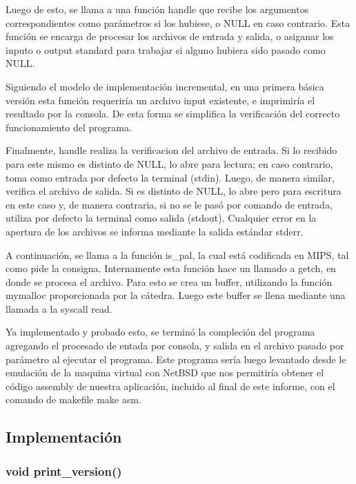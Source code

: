 \documentclass[10pt,a4paper]{article}
\begin{document}
Luego de esto, se llama a una función handle que recibe los argumentos correspondientes como parámetros si los hubiese, o NULL en caso contrario. Esta función se encarga de procesar los archivos de entrada y salida, o asiganar los inputo o output standard para trabajar si alguno hubiera sido pasado como NULL.

Siguiendo el modelo de implementación incremental, en una primera básica versión esta función requeriría un archivo input existente, e imprimiría el resultado por la consola. De esta forma se simplifica la verificación del correcto funcionamiento del programa.

Finalmente, handle realiza la verificacion del archivo de entrada. Si lo recibido para este mismo es distinto de NULL, lo abre para lectura; en caso contrario, toma como entrada por defecto la terminal (stdin). Luego, de manera similar, verifica el archivo de salida. Si es distinto de NULL, lo abre pero para escritura en este caso y, de manera contraria, si no se le pasó por comando de entrada, utiliza por defecto la terminal como salida (stdout). Cualquier error en la apertura de los archivos se informa mediante la salida estándar stderr.

A continuación, se llama a la función is_pal, la cual está codificada en MIPS, tal como pide la consigna. Internamente esta función hace un llamado a getch, en donde se procesa el archivo. Para esto se crea un buffer, utilizando la función mymalloc proporcionada por la cátedra. Luego este buffer se llena mediante una llamada a la syscall read. 



Ya implementado y probado esto, se terminó la compleción del programa agregando el procesado de entada por consola, y salida en el archivo pasado por parámetro al ejecutar el programa. Este programa sería luego levantado desde le emulación de la maquina virtual con NetBSD que nos permitiría obtener el código assembly de nuestra aplicación, incluido al final de este informe, con el comando de makefile make asm.

\newpage

\subsection{Implementación}

\subsubsection{void print\_version()}
\end{document}
